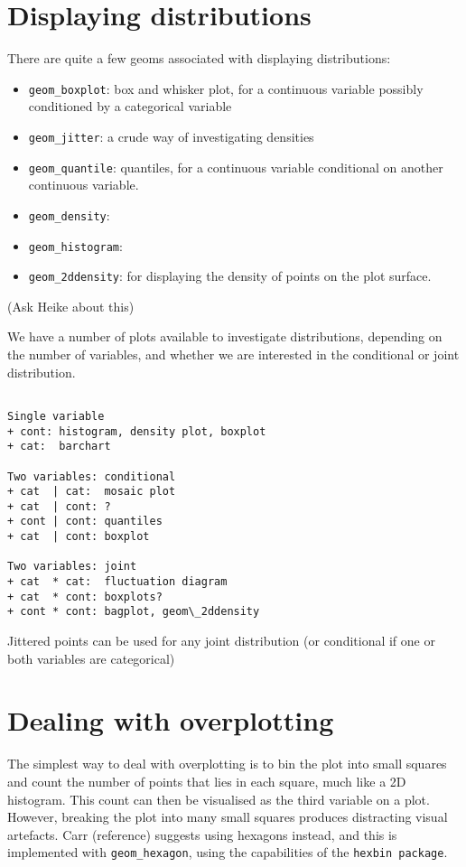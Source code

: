 \section{Displaying distributions}\label{sec:distributions}

There are quite a few geoms associated with displaying distributions:

\begin{itemize}
	\item {\tt geom\_boxplot}: box and whisker plot, for a continuous variable possibly conditioned by a categorical variable
	\item {\tt geom\_jitter}: a crude way of investigating densities
	\item {\tt geom\_quantile}: quantiles, for a continuous variable conditional on another continuous variable.
	\item {\tt geom\_density}: 
	\item {\tt geom\_histogram}: 
	\item {\tt geom\_2ddensity}: for displaying the density of points on the plot surface.
\end{itemize}

(Ask Heike about this)

We have a number of plots available to investigate distributions, depending on the number of variables, and whether we are interested in the conditional or joint distribution.

\begin{Verbatim}
  
Single variable
+ cont: histogram, density plot, boxplot
+ cat:  barchart

Two variables: conditional
+ cat  | cat:  mosaic plot
+ cat  | cont: ?
+ cont | cont: quantiles
+ cat  | cont: boxplot

Two variables: joint
+ cat  * cat:  fluctuation diagram
+ cat  * cont: boxplots?
+ cont * cont: bagplot, geom\_2ddensity
\end{Verbatim}

Jittered points can be used for any joint distribution (or conditional if one or both variables are categorical)

\section{Dealing with overplotting}\label{sec:overplotting}

The simplest way to deal with overplotting is to bin the plot into small squares and count the number of points that lies in each square, much like a 2D histogram.  This count can then be visualised as the third variable on a plot.  However, breaking the plot into many small squares produces distracting visual artefacts.  Carr (reference) suggests using hexagons instead, and this is implemented with {\tt geom\_hexagon}, using the capabilities of the {\tt hexbin package}.

